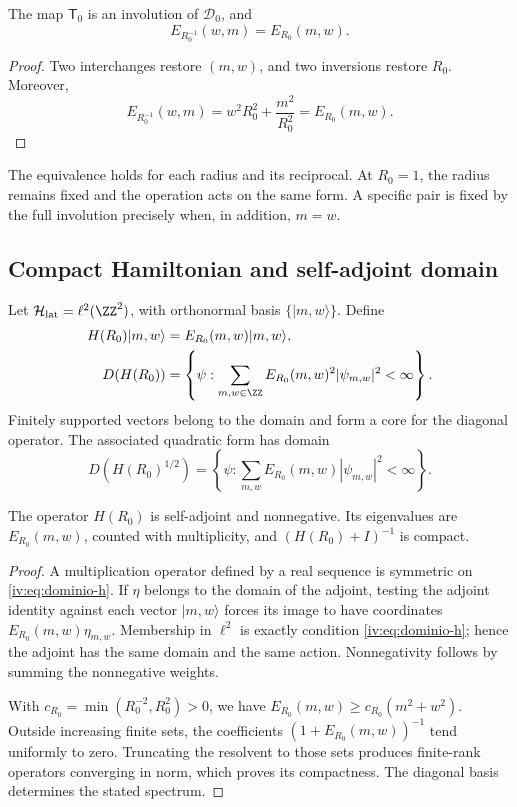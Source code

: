 \begin{theorem}
\label{iv:thm:dualidad-escalar}
The map \(\mathsf T_0\) is an involution of
\(\mathscr D_0\), and
\[
 E_{R_0^{-1}}(w,m)=E_{R_0}(m,w).
\]
\end{theorem}
\begin{proof}
Two interchanges restore \((m,w)\), and two inversions restore
\(R_0\). Moreover,
\[
 E_{R_0^{-1}}(w,m)=w^2R_0^2+\frac{m^2}{R_0^2}
 =E_{R_0}(m,w).
\]
\end{proof}

The equivalence holds for each radius and its reciprocal. At \(R_0=1\),
the radius remains fixed and the operation acts on the same form.
A specific pair is fixed by the full involution precisely
when, in addition, \(m=w\).

\subsection{Compact Hamiltonian and self-adjoint domain}

Let \(\mathcal H_{\mathrm{lat}}=\ell^2(\ZZ^2)\), with
orthonormal basis \(\{|m,w\rangle\}\). Define
\begin{align}
 H(R_0)|m,w\rangle&=E_{R_0}(m,w)|m,w\rangle,\label{iv:eq:hamiltoniano}\\
 D(H(R_0))&=\left\{\psi:\sum_{m,w\in\ZZ}
 E_{R_0}(m,w)^2|\psi_{m,w}|^2<\infty\right\}.\label{iv:eq:dominio-h}
\end{align}
Finitely supported vectors belong to the domain and form a
core for the diagonal operator. The associated quadratic form has
domain
\[
 D(H(R_0)^{1/2})=\left\{\psi:\sum_{m,w}
 E_{R_0}(m,w)|\psi_{m,w}|^2<\infty\right\}.
\]

\begin{proposition}
\label{iv:prop:h-autoadjunto}
The operator \(H(R_0)\) is self-adjoint and nonnegative. Its
eigenvalues are \(E_{R_0}(m,w)\), counted with multiplicity,
and \((H(R_0)+I)^{-1}\) is compact.
\end{proposition}
\begin{proof}
A multiplication operator defined by a real sequence is symmetric
on \eqref{iv:eq:dominio-h}. If \(\eta\) belongs to the domain
of the adjoint, testing the adjoint identity against each vector
\(|m,w\rangle\) forces its image to have coordinates
\(E_{R_0}(m,w)\eta_{m,w}\). Membership in
\(\ell^2\) is exactly condition \eqref{iv:eq:dominio-h}; hence
the adjoint has the same domain and the same action. Nonnegativity
follows by summing the nonnegative weights.

With \(c_{R_0}=\min(R_0^{-2},R_0^2)>0\), we have
\(E_{R_0}(m,w)\geq c_{R_0}(m^2+w^2)\). Outside increasing
finite sets, the coefficients
\((1+E_{R_0}(m,w))^{-1}\) tend uniformly to zero.
Truncating the resolvent to those sets produces finite-rank
operators converging in norm, which proves its
compactness. The diagonal basis determines the stated spectrum.
\end{proof}

